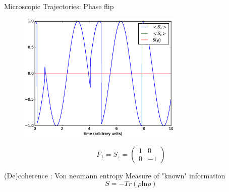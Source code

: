 \documentclass{beamer}
\begin{document}
\begin{frame}{Microscopic Trajectories: Phase flip}
	\begin{figure}[h]
		\centering
		\includegraphics[width=0.7\textwidth]{figs/phase_flip_1.eps}
	\end{figure}
	\begin{equation*}
	F_1 = S_z =
	\begin{pmatrix}
	1 & 0 \\
	0 & -1 
	\end{pmatrix}
	\end{equation*}
\end{frame}
\begin{frame}{(De)coherence : Von neumann entropy}
	Measure of "known" information
	\begin{equation}
	S = -Tr(\rho \text{ln}\rho)
	\end{equation}
\end{frame}
\end{document}
